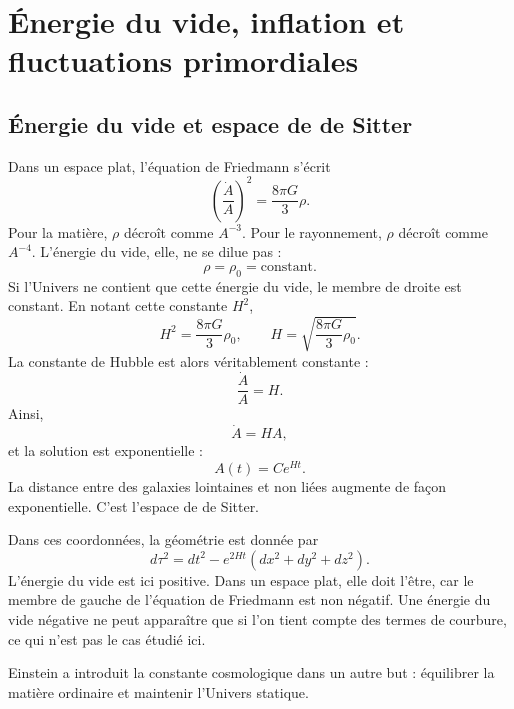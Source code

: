 \chapter{Énergie du vide, inflation et fluctuations primordiales}

\section{Énergie du vide et espace de de Sitter}

Dans un espace plat, l’équation de Friedmann s’écrit
\begin{equation}
\left(\frac{\dot A}{A}\right)^2=\frac{8\pi G}{3}\rho.
\end{equation}
Pour la matière, \(\rho\) décroît comme \(A^{-3}\). Pour le rayonnement, \(\rho\) décroît comme \(A^{-4}\). L’énergie du vide, elle, ne se dilue pas :
\begin{equation}
\rho=\rho_0=\text{constant}.
\end{equation}
Si l’Univers ne contient que cette énergie du vide, le membre de droite est constant. En notant cette constante \(H^2\),
\begin{equation}
H^2=\frac{8\pi G}{3}\rho_0,
\qquad
H=\sqrt{\frac{8\pi G}{3}\rho_0}.
\end{equation}
La constante de Hubble est alors véritablement constante :
\begin{equation}
\frac{\dot A}{A}=H.
\end{equation}
Ainsi,
\begin{equation}
\dot A=HA,
\end{equation}
et la solution est exponentielle :
\begin{equation}
A(t)=C e^{Ht}.
\end{equation}
La distance entre des galaxies lointaines et non liées augmente de façon exponentielle. C’est l’espace de de Sitter.

Dans ces coordonnées, la géométrie est donnée par
\begin{equation}
d\tau^2=dt^2-e^{2Ht}\left(dx^2+dy^2+dz^2\right).
\end{equation}
L’énergie du vide est ici positive. Dans un espace plat, elle doit l’être, car le membre de gauche de l’équation de Friedmann est non négatif. Une énergie du vide négative ne peut apparaître que si l’on tient compte des termes de courbure, ce qui n’est pas le cas étudié ici.

Einstein a introduit la constante cosmologique dans un autre but : équilibrer la matière ordinaire et maintenir l’Univers statique.

